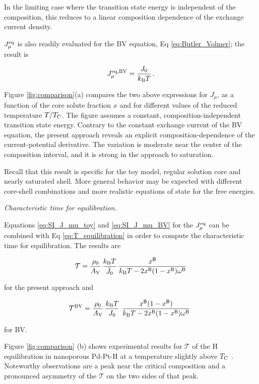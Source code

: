 \documentclass[english,aps,prb,showkeys,reprint]{revtex4-2}
\newcommand{\be}{\begin{equation}}
\newcommand{\ee}{\end{equation}}
\begin{document}
In the limiting case where the transition state energy is independent of the composition, this reduces to a linear composition dependence of the exchange current density.

$J^{\rm eq}_{\mu}$ is also readily evaluated for the BV equation, Eq \ref{eq:Butler_Volmer}; the result is

\be
\label{eq:SI_J_mu_BV}
J^{\rm eq, BV}_{\mu}
=
\frac{J_0 }{k_{\rm B} T} \,.
\ee

Figure \ref{fig:comparison}(a) compares the two above expressions for $J_{\mu}$, as a function of the core solute fraction $x$ and for different values of the reduced temperature $T / T_{\rm C}$. The figure assumes a constant, composition-independent transition state energy. Contrary to the constant exchange current of the BV equation, the present approach reveals an explicit composition-dependence of the current-potential derivative. The variation is moderate near the center of the composition interval, and it is strong in the approach to saturation.

Recall that this result is specific for the toy model, regular solution core and nearly saturated shell. More general behavior may be expected with different core-shell combinations and more realistic equations of state for the free energies.


\textit{Characteristic time for equilibration. }

Equations \ref{eq:SI_J_mu_toy} and \ref{eq:SI_J_mu_BV} for the $J^{\rm eq}_{\mu}$ can be combined with Eq \ref{eq:T_equilibration} in order to compute the characteristic time for equilibration. The results are

\be
\label{eq:SI_T_regsol}
\mathcal{T}
=
\frac{\rho_0}{A_{\rm V}} \,
\frac{k_{\rm B} T}{\tilde J_0} \,
\frac{x^{\sf B}} {k_{\rm B} T - 2 x^{\sf B} (1-x^{\sf B}) \omega^{\sf B}}
\ee

for the present approach and

\be
\label{eq:SI_T_BV}
\mathcal{T}^{\rm BV}
=
\frac{\rho_0}{A_{\rm V}} \,
\frac{k_{\rm B} T}{J_0} \,\,
\frac{x^{\sf B} (1-x^{\sf B})} {k_{\rm B} T - 2 x^{\sf B} (1-x^{\sf B}) \omega^{\sf B}} \,\,
\ee

for BV.

Figure \ref{fig:comparison} (b) shows experimental results for $\mathcal T$ of the H equilibration in nanoporous Pd-Pt-H at a temperature slightly above $T_{\rm C}$ \cite[Fig 12]{BapariWeissmüller2025}. Noteworthy observations are a peak near the critical composition and a pronounced asymmetry of the $\mathcal T$ on the two sides of that peak.
\end{document}

